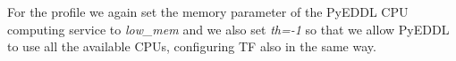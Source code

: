 \begin{figure}[!htb]

\end{figure}


For the profile we again set the memory parameter of the PyEDDL CPU computing service to \textit{low\_mem} and we also set \textit{th=-1} so that we allow PyEDDL to use all the available CPUs, configuring TF also in the same way. 

